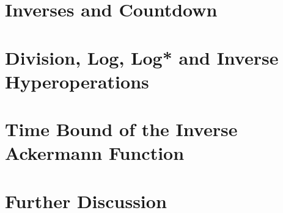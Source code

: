 \documentclass[a4paper,USenglish,cleveref, autoref]{lipics-v2019}
\theoremstyle{plain}
\theoremstyle{definition}
\begin{document}
\section{Inverses and Countdown}
\label{sec:countdown}


\section{Division, Log, Log* and Inverse Hyperoperations}
\label{sec: inv-hyperop}


\section{Time Bound of the Inverse Ackermann Function}
\label{sec: inv-ack}


\section{Further Discussion}
\label{sec: discussion}










\end{document}
